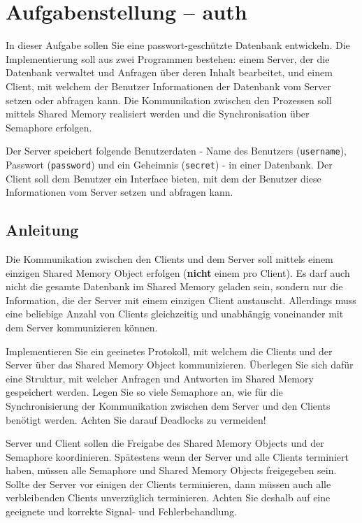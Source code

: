 



\section*{Aufgabenstellung -- auth}

In dieser Aufgabe sollen Sie eine passwort-geschützte Datenbank entwickeln. Die
Implementierung soll aus zwei Programmen bestehen: einem Server, der die
Datenbank verwaltet und Anfragen über deren Inhalt bearbeitet, und einem
Client, mit welchem der Benutzer Informationen der Datenbank vom Server setzen
oder abfragen kann. Die Kommunikation zwischen den Prozessen soll mittels
Shared Memory realisiert werden und die Synchronisation über Semaphore
erfolgen.

Der Server speichert folgende Benutzerdaten - Name des Benutzers
(\texttt{username}), Passwort (\texttt{password}) und ein Geheimnis
(\texttt{secret}) - in einer Datenbank. Der Client soll dem Benutzer ein
Interface bieten, mit dem der Benutzer diese Informationen vom Server setzen
und abfragen kann.

\subsection*{Anleitung}

Die Kommunikation zwischen den Clients und dem Server soll mittels einem
einzigen Shared Memory Object erfolgen (\textbf{nicht} einem pro Client). Es
darf auch nicht die gesamte Datenbank im Shared Memory geladen sein,
sondern nur die Information, die der Server mit einem einzigen Client
austauscht. Allerdings muss eine beliebige Anzahl von Clients gleichzeitig und
unabhängig voneinander mit dem Server kommunizieren können.

Implementieren Sie ein geeinetes Protokoll, mit welchem die Clients und der
Server über das Shared Memory Object kommunizieren. Überlegen Sie sich dafür
eine Struktur, mit welcher Anfragen und Antworten im Shared Memory gespeichert
werden. Legen Sie so viele Semaphore an, wie für die Synchronisierung der
Kommunikation zwischen dem Server und den Clients benötigt werden. Achten Sie
darauf Deadlocks zu vermeiden!

Server und Client sollen die Freigabe des Shared Memory Objects und der
Semaphore koordinieren. Spätestens wenn der Server und alle Clients terminiert
haben, müssen alle Semaphore und Shared Memory Objects freigegeben sein. Sollte
der Server vor einigen der Clients terminieren, dann müssen auch alle
verbleibenden Clients unverzüglich terminieren. Achten Sie deshalb auf eine
geeignete und korrekte Signal- und Fehlerbehandlung.

